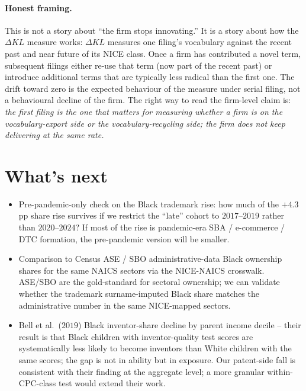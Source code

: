 \documentclass[11pt]{article}
\begin{document}
\paragraph{Honest framing.} This is not a story about ``the
firm stops innovating.'' It is a story about how the $\Delta KL$
measure works: $\Delta KL$ measures one filing's vocabulary against
the recent past and near future of its NICE class. Once a firm has
contributed a novel term, subsequent filings either re-use that
term (now part of the recent past) or introduce additional terms
that are typically less radical than the first one. The drift
toward zero is the expected behaviour of the measure under serial
filing, not a behavioural decline of the firm. The right way to
read the firm-level claim is: \emph{the first filing is the one
that matters for measuring whether a firm is on the
vocabulary-export side or the vocabulary-recycling side; the firm
does not keep delivering at the same rate.}

\section*{What's next}

\begin{itemize}\setlength\itemsep{2pt}
\item Pre-pandemic-only check on the Black trademark rise: how
much of the $+4.3$pp share rise survives if we restrict the
``late'' cohort to $2017$--$2019$ rather than $2020$--$2024$? If
most of the rise is pandemic-era SBA / e-commerce / DTC formation,
the pre-pandemic version will be smaller.
\item Comparison to Census ASE / SBO administrative-data Black
ownership shares for the same NAICS sectors via the NICE-NAICS
crosswalk. ASE/SBO are the gold-standard for sectoral ownership;
we can validate whether the trademark surname-imputed Black share
matches the administrative number in the same NICE-mapped sectors.
\item Bell et al.\ ($2019$) Black inventor-share decline by parent
income decile -- their result is that Black children with
inventor-quality test scores are systematically less likely to
become inventors than White children with the same scores; the
gap is not in ability but in exposure. Our patent-side fall is
consistent with their finding at the aggregate level; a more
granular within-CPC-class test would extend their work.
\end{itemize}
\end{document}
